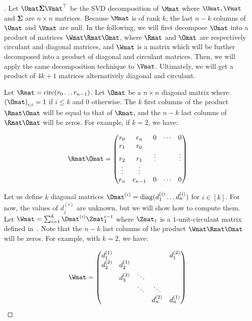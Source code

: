 \begin{proof}[]
Let $\Umat \mathbf{\Sigma} \Vmat^\top$ be the SVD decomposition of $\Mmat$ where $\Umat,\Vmat$ and $\mathbf{\Sigma}$ are $n \times n$ matrices.
Because $\Mmat$ is of rank $k$, the last $n-k$ columns of $\Umat$ and $\Vmat$ are null.
In the following, we will first decompose $\Umat$ into a product of matrices $\Wmat\Rmat\Omat$, where $\Rmat$ and $\Omat$ are respectively circulant and diagonal matrices, and $\Wmat$ is a matrix which will be further decomposed into a product of diagonal and circulant matrices.
Then, we will apply the same decomposition technique to $\Vmat$.
Ultimately, we will get a product of $4k+1$ matrices alternatively diagonal and circulant.

Let $\Rmat = \circulant(r_{0}\ldots r_{n-1})$. Let $\Omat$ be a $n \times n$ diagonal matrix where $\leftmat \Omat \rightmat_{i,i} = 1$ if $i \le k$ and $0$ otherwise.
The $k$ first columns of the product $\Rmat\Omat$ will be equal to that of $\Rmat$, and the $n-k$ last columns of $\Rmat\Omat$ will be zeros. For example, if $k=2$, we have: 

\begin{equation}
  \Rmat\Omat = \leftmatrix
  r_{0} & r_{n} & 0 & \cdots & 0\\
  r_{1} & r_{0}\\
  r_{2} & r_{1} & \vdots &  & \vdots\\
  \vdots & \vdots\\
  r_{n} & r_{n-1} & 0 & \cdots & 0
  \rightmatrix
\end{equation}

\noindent
Let us define $k$ diagonal matrices $\Dmat^{(i)} = \diagonal(d_1^{(i)} \ldots d_n^{(i)})$ for $i \in [k]$.
For now, the values of $d_{j}^{(i)}$ are unknown, but we will show how to compute them.
Let $\Wmat = \sum_{i=1}^{k} \Dmat^{(i)} \Zmat_1^{i-1}$ where $\Zmat_1$ is a $1$-unit-circulant matrix defined in~.
Note that the $n-k$ last columns of the product $\Wmat\Rmat\Omat$ will be zeros.
For example, with $k=2$, we have: 

\begin{equation}
  \Wmat = \leftmatrix
  d_{1}^{(1)} &  &  &  & d_{1}^{(2)} \\
  d_{2}^{(2)} & d_{2}^{(1)} \\
   & d_{3}^{(2)} & \ddots \\
   &  & \ddots & \ddots \\
   &  &  & d_{n}^{(2)} & d_{n}^{(1)}
  \rightmatrix
\end{equation}


\end{proof}
